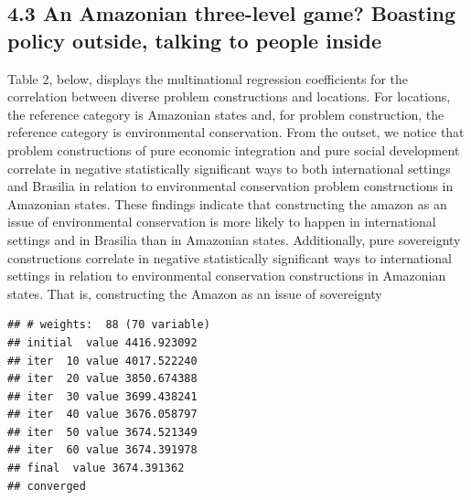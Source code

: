 \documentclass[]{interact}
\theoremstyle{plain}%
\theoremstyle{definition}
\theoremstyle{remark}
\begin{document}
\hypertarget{an-amazonian-three-level-game-boasting-policy-outside-talking-to-people-inside}{%
\subsection{4.3 An Amazonian three-level game? Boasting policy outside,
talking to people
inside}\label{an-amazonian-three-level-game-boasting-policy-outside-talking-to-people-inside}}

Table 2, below, displays the multinational regression coefficients for
the correlation between diverse problem constructions and locations. For
locations, the reference category is Amazonian states and, for problem
construction, the reference category is environmental conservation. From
the outset, we notice that problem constructions of pure economic
integration and pure social development correlate in negative
statistically significant ways to both international settings and
Brasilia in relation to environmental conservation problem constructions
in Amazonian states. These findings indicate that constructing the
amazon as an issue of environmental conservation is more likely to
happen in international settings and in Brasilia than in Amazonian
states. Additionally, pure sovereignty constructions correlate in
negative statistically significant ways to international settings in
relation to environmental conservation constructions in Amazonian
states. That is, constructing the Amazon as an issue of sovereignty

\begin{verbatim}
## # weights:  88 (70 variable)
## initial  value 4416.923092 
## iter  10 value 4017.522240
## iter  20 value 3850.674388
## iter  30 value 3699.438241
## iter  40 value 3676.058797
## iter  50 value 3674.521349
## iter  60 value 3674.391978
## final  value 3674.391362 
## converged
\end{verbatim}
\end{document}
